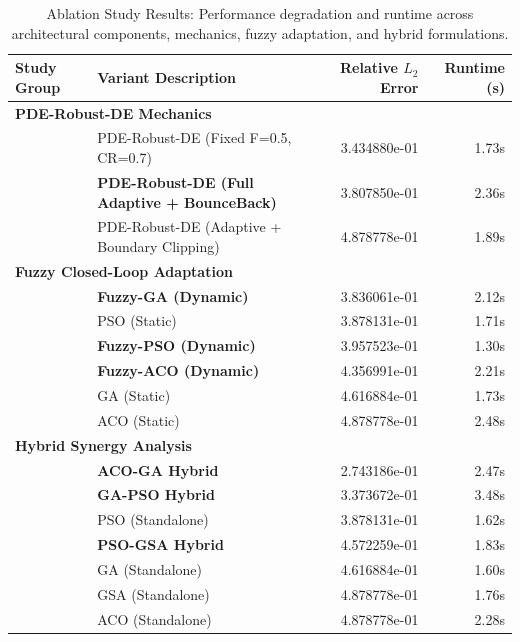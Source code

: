 \begin{table}[t]
\centering
\caption{Ablation Study Results: Performance degradation and runtime across architectural components, mechanics, fuzzy adaptation, and hybrid formulations.}
\label{tab:ablation_results}
\small
\begin{tabular}{llrr}
\toprule
\textbf{Study Group} & \textbf{Variant Description} & \textbf{Relative $L_2$ Error} & \textbf{Runtime (s)} \\
\midrule
\multicolumn{4}{l}{\textbf{PDE-Robust-DE Mechanics}} \\
\midrule
 & PDE-Robust-DE (Fixed F=0.5, CR=0.7)           & 3.434880e-01 &   1.73s \\
 & \textbf{PDE-Robust-DE (Full Adaptive + BounceBack)} & 3.807850e-01 &   2.36s \\
 & PDE-Robust-DE (Adaptive + Boundary Clipping)  & 4.878778e-01 &   1.89s \\
\midrule
\multicolumn{4}{l}{\textbf{Fuzzy Closed-Loop Adaptation}} \\
\midrule
 & \textbf{Fuzzy-GA (Dynamic)}                   & 3.836061e-01 &   2.12s \\
 & PSO (Static)                                  & 3.878131e-01 &   1.71s \\
 & \textbf{Fuzzy-PSO (Dynamic)}                  & 3.957523e-01 &   1.30s \\
 & \textbf{Fuzzy-ACO (Dynamic)}                  & 4.356991e-01 &   2.21s \\
 & GA (Static)                                   & 4.616884e-01 &   1.73s \\
 & ACO (Static)                                  & 4.878778e-01 &   2.48s \\
\midrule
\multicolumn{4}{l}{\textbf{Hybrid Synergy Analysis}} \\
\midrule
 & \textbf{ACO-GA Hybrid}                        & 2.743186e-01 &   2.47s \\
 & \textbf{GA-PSO Hybrid}                        & 3.373672e-01 &   3.48s \\
 & PSO (Standalone)                              & 3.878131e-01 &   1.62s \\
 & \textbf{PSO-GSA Hybrid}                       & 4.572259e-01 &   1.83s \\
 & GA (Standalone)                               & 4.616884e-01 &   1.60s \\
 & GSA (Standalone)                              & 4.878778e-01 &   1.76s \\
 & ACO (Standalone)                              & 4.878778e-01 &   2.28s \\
\bottomrule
\end{tabular}
\end{table}
